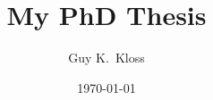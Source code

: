 \documentclass[a4paper]{report}
\begin{document}
\title{My PhD Thesis}
\author{Guy K.\ Kloss}
\date{\today}

\maketitle






\end{document}
